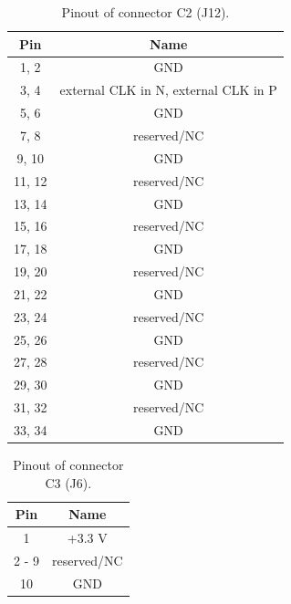 	\begin{table}
	\begin{small}
		\begin{center}
			\begin{tabular}{|c|c|}
				\hline
				Pin & Name\\
				\hline\hline
				1, 2 & GND\\
				\hline
				3, 4 & external CLK in N, external CLK in P\\
				\hline
				5, 6 & GND\\
				\hline
				7, 8 & reserved/NC\\
				\hline
				9, 10 & GND\\
				\hline
				11, 12 & reserved/NC\\
				\hline
				13, 14 & GND\\
				\hline
				15, 16 & reserved/NC\\
				\hline
				17, 18 & GND\\
				\hline
				19, 20 & reserved/NC\\
				\hline
				21, 22 & GND\\
				\hline
				23, 24 & reserved/NC\\
				\hline
				25, 26 & GND\\
				\hline
				27, 28 & reserved/NC\\
				\hline
				29, 30 & GND\\
				\hline
				31, 32 & reserved/NC\\
				\hline
				33, 34 & GND\\
				\hline
			\end{tabular}
			\caption{Pinout of connector C2 (J12).}
			\label{con2}
		\end{center}
	\end{small}
	\end{table}

	\begin{table}
	\begin{small}
		\begin{center}
			\begin{tabular}{|c|c|}
				\hline
				Pin & Name\\
				\hline\hline
				1 & +3.3 V\\
				\hline
				2 - 9 & reserved/NC\\
				\hline
				10 & GND\\
				\hline
			\end{tabular}
			\caption{Pinout of connector C3 (J6).}
			\label{con3}
		\end{center}
	\end{small}
	\end{table}

